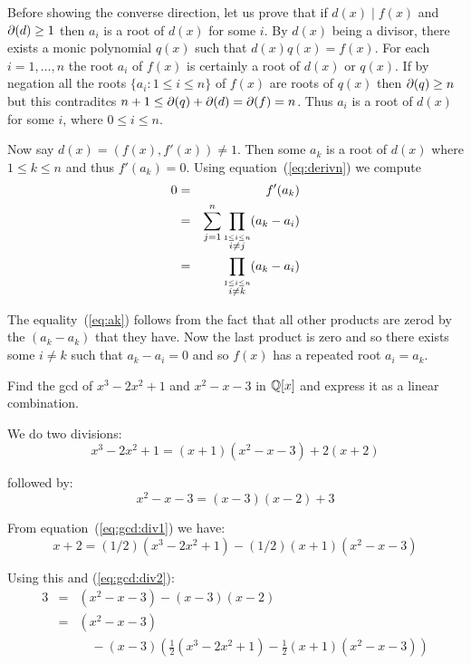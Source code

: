 \begin{myenumerate}
Before showing the converse direction,
let us prove that if \(d(x)\mid f(x)\) and \(\partial(d)\geq 1\)
then \(a_i\) is a root of \(d(x)\) for some $i$.
By \(d(x)\) being a divisor, there exists a monic polynomial \(q(x)\)
such that \(d(x)q(x)=f(x)\).
For each \(i=1,\ldots,n\) the root \(a_i\) of \(f(x)\)
is certainly a root of \(d(x)\) or \(q(x)\).
If by negation all the roots \(\{a_i:1\leq i\leq n\}\) of \(f(x)\)
are roots of \(q(x)\)
then \(\partial(q)\geq n\)  but this contraditcs
\(n+1\leq \partial(q)+\partial(d)=\partial(f)=n\).
Thus \(a_i\) is a root of \(d(x)\) for some $i$, where \(0\leq i \leq n\).

Now say \(d(x)=(f(x),f'(x))\neq 1\).
Then some \(a_k\) is a root of \(d(x)\) where \(1\leq k\leq n\)
and thus \(f'(a_k)=0\). Using equation~(\ref{eq:derivn}) we compute
\begin{eqnarray}
0 & = & f'(a_k) \notag \\
  & = & \sum_{j=1}^n \prod_{\overset{1\leq i\leq n}{i\neq j}}(a_k-a_i) \notag \\
  & = & \prod_{\overset{1\leq i\leq n}{i\neq k}}(a_k-a_i) \label{eq:ak}
\end{eqnarray}

The equality~(\ref{eq:ak}) follows from the fact that all other products
are zerod by the \((a_k-a_k)\) that they have.
Now the last product is zero and so there exists some \(i\neq k\) such
that \(a_k-a_i=0\) and so \(f(x)\) has a repeated root \(a_i=a_k\).


\item
\begin{excopy}
Find the gcd of \(x^3-2x^2+1\) and \(x^2-x-3\) in \(\mathbb{Q}[x]\)
and express it as a linear combination.
\end{excopy}

We do two divisions:
\begin{equation} \label{eq:gcd:div1}
x^3-2x^2+1 = (x+1)(x^2-x-3)+2(x+2)
\end{equation}

followed by:
\begin{equation}\label{eq:gcd:div2}
x^2-x-3 = (x-3)(x-2)+3
\end{equation}

From equation~(\ref{eq:gcd:div1}) we have:
\begin{equation}
x+2 = (1/2)(x^3-2x^2+1) - (1/2)(x+1)(x^2-x-3)
\end{equation}

Using this and (\ref{eq:gcd:div2}):
\begin{eqnarray*}
3 &=& (x^2-x-3) - (x-3)(x-2) \\
 &=& (x^2-x-3) \\
 & & \quad - (x-3)\left(\frac{1}{2}(x^3-2x^2+1)
                        -\frac{1}{2}(x+1)(x^2-x-3)\right)
\end{eqnarray*}


\end{myenumerate}
